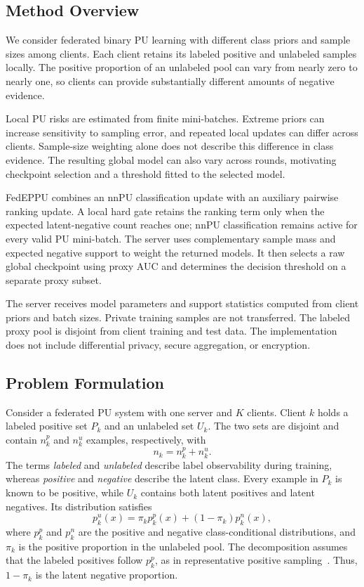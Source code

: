 \documentclass[lettersize,journal]{IEEEtran}
\begin{document}
\subsection{Method Overview}
We consider federated binary PU learning with different class priors and sample sizes among clients. Each client retains its labeled positive and unlabeled samples locally. The positive proportion of an unlabeled pool can vary from nearly zero to nearly one, so clients can provide substantially different amounts of negative evidence.

Local PU risks are estimated from finite mini-batches. Extreme priors can increase sensitivity to sampling error, and repeated local updates can differ across clients. Sample-size weighting alone does not describe this difference in class evidence. The resulting global model can also vary across rounds, motivating checkpoint selection and a threshold fitted to the selected model.

FedEPPU combines an nnPU classification update with an auxiliary pairwise ranking update. A local hard gate retains the ranking term only when the expected latent-negative count reaches one; nnPU classification remains active for every valid PU mini-batch. The server uses complementary sample mass and expected negative support to weight the returned models. It then selects a raw global checkpoint using proxy AUC and determines the decision threshold on a separate proxy subset.

The server receives model parameters and support statistics computed from client priors and batch sizes. Private training samples are not transferred. The labeled proxy pool is disjoint from client training and test data. The implementation does not include differential privacy, secure aggregation, or encryption.

\subsection{Problem Formulation}

Consider a federated PU system with one server and $K$ clients. Client $k$ holds a labeled positive set $P_k$ and an unlabeled set $U_k$. The two sets are disjoint and contain $n_k^p$ and $n_k^u$ examples, respectively, with
\begin{equation}
n_k=n_k^p+n_k^u.
\label{eq:client-size}
\end{equation}
The terms \emph{labeled} and \emph{unlabeled} describe label observability during training, whereas \emph{positive} and \emph{negative} describe the latent class. Every example in $P_k$ is known to be positive, while $U_k$ contains both latent positives and latent negatives. Its distribution satisfies
\begin{equation}
p_k^u(x)=\pi_k p_k^p(x)+(1-\pi_k)p_k^n(x),
\label{eq:pu-mixture}
\end{equation}
where $p_k^p$ and $p_k^n$ are the positive and negative class-conditional distributions, and $\pi_k$ is the positive proportion in the unlabeled pool. The decomposition assumes that the labeled positives follow $p_k^p$, as in representative positive sampling~\cite{ref_elkan,ref_pu_survey}. Thus, $1-\pi_k$ is the latent negative proportion.
\end{document}

